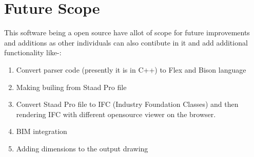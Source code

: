 \section{Future Scope}                                                  
This software being a open source have allot of scope for future improvements
and additions as other individuals can also contibute in it and add additional functionality
like-:                                                                  
\begin{enumerate}                                                       
\item Convert parser code (presently it is in C++) to Flex and Bison language                                 
\item Making builing from Staad Pro file                     
\item Convert Staad Pro file to IFC (Industry Foundation Classes) and then rendering IFC with different opensource viewer on the browser.                              
\item BIM integration
\item Adding dimensions to the output drawing
\end{enumerate}  
